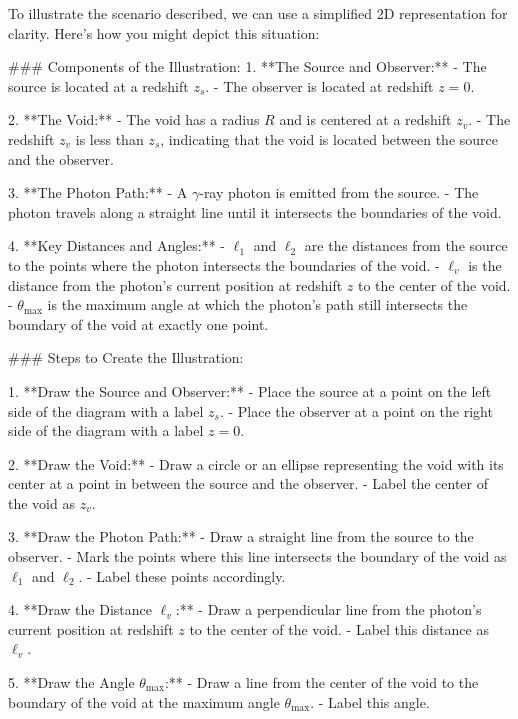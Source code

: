 To illustrate the scenario described, we can use a simplified 2D representation for clarity. Here’s how you might depict this situation:

### Components of the Illustration:
1. **The Source and Observer:**
   - The source is located at a redshift \( z_s \).
   - The observer is located at redshift \( z = 0 \).

2. **The Void:**
   - The void has a radius \( R \) and is centered at a redshift \( z_v \).
   - The redshift \( z_v \) is less than \( z_s \), indicating that the void is located between the source and the observer.

3. **The Photon Path:**
   - A \(\gamma\)-ray photon is emitted from the source.
   - The photon travels along a straight line until it intersects the boundaries of the void.

4. **Key Distances and Angles:**
   - \(\ell_1\) and \(\ell_2\) are the distances from the source to the points where the photon intersects the boundaries of the void.
   - \(\ell_v\) is the distance from the photon's current position at redshift \( z \) to the center of the void.
   - \(\theta_{\max}\) is the maximum angle at which the photon's path still intersects the boundary of the void at exactly one point.

### Steps to Create the Illustration:

1. **Draw the Source and Observer:**
   - Place the source at a point on the left side of the diagram with a label \( z_s \).
   - Place the observer at a point on the right side of the diagram with a label \( z = 0 \).

2. **Draw the Void:**
   - Draw a circle or an ellipse representing the void with its center at a point in between the source and the observer.
   - Label the center of the void as \( z_v \).

3. **Draw the Photon Path:**
   - Draw a straight line from the source to the observer.
   - Mark the points where this line intersects the boundary of the void as \(\ell_1\) and \(\ell_2\).
   - Label these points accordingly.

4. **Draw the Distance \(\ell_v\):**
   - Draw a perpendicular line from the photon's current position at redshift \( z \) to the center of the void.
   - Label this distance as \(\ell_v\).

5. **Draw the Angle \(\theta_{\max}\):**
   - Draw a line from the center of the void to the boundary of the void at the maximum angle \(\theta_{\max}\).
   - Label this angle.


